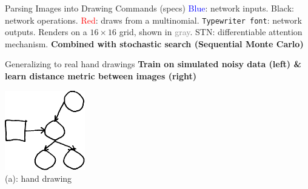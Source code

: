 \documentclass[final]{beamer}
\newlength{\onecolwid}
\newlength{\twocolwid}
\begin{document}
\begin{frame}[t]
\begin{columns}[t]
\begin{column}{\twocolwid}
\begin{columns}[t,totalwidth=\twocolwid]
\begin{column}{\onecolwid}
\begin{block}{Parsing Images into Drawing Commands (specs)}
{\small   \textcolor{blue}{Blue}: network inputs. Black: network operations. \textcolor{red}{Red}: draws from a multinomial. \texttt{Typewriter font}: network outputs. Renders on a $16\times 16$ grid, shown in \textcolor{gray}{gray}. STN: differentiable attention mechanism. \textbf{Combined with stochastic search (Sequential Monte Carlo)}}

\end{block}

\begin{block}{Generalizing to real hand drawings}
  \textbf{  Train on simulated noisy data (left) \& learn distance metric between images (right)}\\
  \newcommand{\noisySize}{0.2\textwidth}
  \begin{minipage}[t]{\noisySize}
    \centering\includegraphics[width = \textwidth]{figures/expert-60-reduced.png}\\
{\small     (a): hand drawing}
  \end{minipage}%
  \begin{minipage}[t]{\noisySize}

\end{minipage}
\end{block}
\end{column}
\end{columns}
\end{column}
\end{columns}
\end{frame}
\end{document}
